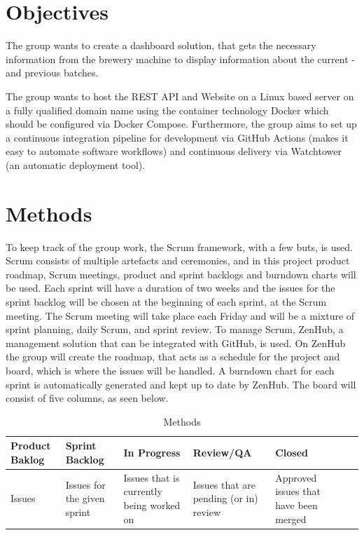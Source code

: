\section{Objectives}
The group wants to create a dashboard solution, that gets the necessary
information from the brewery machine to display information about the current
- and previous batches.

The group wants to host the REST API and Website on a Linux based server on a
fully qualified domain name using the container technology Docker which should
be configured via Docker Compose. Furthermore, the group aims to set up a
continuous integration pipeline for development via GitHub Actions (makes it
easy to automate software workflows) and continuous delivery via Watchtower (an
automatic deployment tool).

\section{Methods}
To keep track of the group work, the Scrum framework, with a few buts, is used.
Scrum consists of multiple artefacts and ceremonies, and in this project product
roadmap, Scrum meetings, product and sprint backlogs and burndown charts will
be used. Each sprint will have a duration of two weeks and the issues for the
sprint backlog will be chosen at the beginning of each sprint, at the Scrum
meeting. The Scrum meeting will take place each Friday and will be a mixture of
sprint planning, daily Scrum, and sprint review. To manage Scrum, ZenHub, a
management solution that can be integrated with GitHub, is used. On ZenHub the
group will create the roadmap, that acts as a schedule for the project and
board, which is where the issues will be handled. A burndown chart for each
sprint is automatically generated and kept up to date by ZenHub. The board will
consist of five columns, as seen below.

\begin{table}[H]
    \begin{tabularx}{\textwidth}{|>{\RaggedRight}X|>{\RaggedRight}X|>{\RaggedRight}X|>{\RaggedRight}X|>{\RaggedRight}X|>{\RaggedRight}X|>{\RaggedRight}X|}
        \hline                             
        Product Baklog & Sprint Backlog & In Progress & Review/QA & Closed \\
        \hline
        Issues & Issues for the given sprint & Issues that is currently being worked on & Issues that are pending (or in) review & Approved issues that have been merged    \\
        \hline
    \end{tabularx}
    \caption{Methods} 
    \label{table:Methods}
\end{table} 

